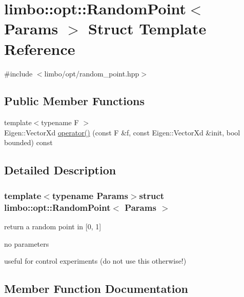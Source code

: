 \hypertarget{structlimbo_1_1opt_1_1_random_point}{}\section{limbo\+:\+:opt\+:\+:Random\+Point$<$ Params $>$ Struct Template Reference}
\label{structlimbo_1_1opt_1_1_random_point}


{\ttfamily \#include $<$limbo/opt/random\+\_\+point.\+hpp$>$}

\subsection*{Public Member Functions}
\begin{DoxyCompactItemize}
\item 
{\footnotesize template$<$typename F $>$ }\\Eigen\+::\+Vector\+Xd \hyperlink{structlimbo_1_1opt_1_1_random_point_a7403cebcb83dbaa75634965facfecc7e}{operator()} (const F \&f, const Eigen\+::\+Vector\+Xd \&init, bool bounded) const 
\end{DoxyCompactItemize}


\subsection{Detailed Description}
\subsubsection*{template$<$typename Params$>$struct limbo\+::opt\+::\+Random\+Point$<$ Params $>$}


\begin{DoxyItemize}
\item return a random point in \mbox{[}0, 1\mbox{]}
\item no parameters
\item useful for control experiments (do not use this otherwise!) 
\end{DoxyItemize}

\subsection{Member Function Documentation}
\hypertarget{structlimbo_1_1opt_1_1_random_point_a7403cebcb83dbaa75634965facfecc7e}{}
